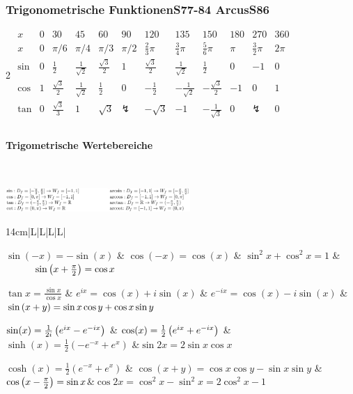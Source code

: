 \subsubsection{Trigonometrische Funktionen\color{red}S77-84 \color{black} Arcus\color{red}S86}\begin{multicols}{2}
	\hspace{0pt}\scalebox{0.7}
	{
		$\begin{array}{c|c|c|c|c|c|c|c|c|c|c|c}
		x & 0& 30 & 45& 60 & 90 & 120 & 135& 150& 180 & 270 & 360 \\ \hline
		x & 0 & \pi / 6 & \pi / 4 & \pi / 3 & \pi / 2 & \frac{2}{3}\pi& \frac{3}{4}\pi& \frac{5}{6}\pi& \pi  & \frac{3}{2}\pi & 2 \pi \\ \hline
		\sin & 0 & \frac{1}{2} & \frac{1}{\sqrt{2}} & \frac{\sqrt 3}{2} & 1 & \frac{\sqrt 3}{2} & \frac{1}{\sqrt{2}} & \frac{1}{2} & 0 & -1 & 0 \\
		\cos & 1 & \frac{\sqrt 3}{2} & \frac{1}{\sqrt 2} & \frac{1}{2} & 0 & -\frac{1}{2} & -\frac{1}{\sqrt 2}  & -\frac{\sqrt 3}{2}   & -1 & 0 & 1 \\
		\tan & 0 & \frac{\sqrt{3}}{3}&1 &\sqrt{3} & \lightning & -\sqrt{3}& -1& -\frac{1}{\sqrt{3}} & 0 & \lightning & 0\\
		\end{array}$
	}\
	
	\paragraph{Trigometrische Wertebereiche}\
	
	\includegraphics[width=7cm]{images/TrigFun.PNG}\\	
	
\end{multicols}


\begin{tabulary}{14cm}{|L|L|L|L|}
	
	\hline
	$ \sin (-x) = -\sin (x) $ 							& $ \cos (-x) = \cos (x) $ 							& 	$\sin^2 x + \cos^2 x = 1$ 			& $\qquad \quad \sin \left(x + \frac{\pi}{2}\right) = \cos x$	\\ \hline
	
	$ \tan x = \frac{\sin x}{\cos x} $ 					& $ e^{ix}=\cos(x)+i\sin(x) $ 						& 	$e^{-ix}=\cos(x)-i\sin(x) $			&$\sin \left(x + y\right) = \sin x \cos y + \cos x \sin y$	\\ \hline
	
	$ \sin(x)=\frac{1}{2i}\left(e^{ix}-e^{-ix}\right) $ 	& $ \cos(x)=\frac{1}{2}\left(e^{ix}+e^{-ix}\right) $ 	& 	$\sinh(x)=\frac{1}{2}(-e^{-x}+e^x)$	&$	\sin 2x = 2 \sin x \cos x$	\\ \hline
	
	$ \cosh(x)=\frac{1}{2}(e^{-x}+e^x) $				& $ \cos (x + y) = \cos x \cos y - \sin x \sin y $	&	$\cos \left(x - \frac{\pi}{2}\right) = \sin x$&$\cos 2x = \cos^2 x - \sin^2 x = 2\cos^2 x - 1$	\\ \hline
	
\end{tabulary}\\




